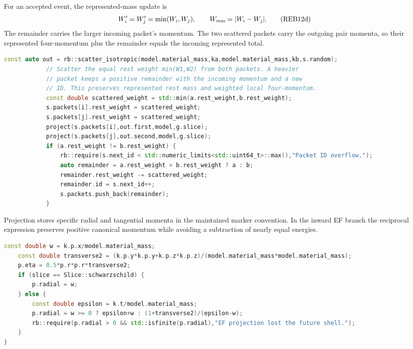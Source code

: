 For an accepted event, the represented-mass update is
\[
 W_i'=W_j'=\min(W_i,W_j),\qquad
 W_{\rm rem}=|W_i-W_j|.
 \tag{REB12d}
\]
The remainder carries the larger incoming packet's momentum. The two
scattered packets carry the outgoing pair momenta, so their represented
four-momentum plus the remainder equals the incoming represented total.
\par\medskip\noindent
\begin{minipage}{\linewidth}
\begin{lstlisting}[language=C++,showstringspaces=false]
            const auto out = rb::scatter_isotropic(model.material_mass,ka,model.material_mass,kb,s.random);
            // Scatter the equal rest weight min(W1,W2) from both packets. A heavier
            // packet keeps a positive remainder with the incoming momentum and a new
            // ID. This preserves represented rest mass and weighted local four-momentum.
            const double scattered_weight = std::min(a.rest_weight,b.rest_weight);
            s.packets[i].rest_weight = scattered_weight;
            s.packets[j].rest_weight = scattered_weight;
            project(s.packets[i],out.first,model,g.slice);
            project(s.packets[j],out.second,model,g.slice);
            if (a.rest_weight != b.rest_weight) {
                rb::require(s.next_id < std::numeric_limits<std::uint64_t>::max(),"Packet ID overflow.");
                auto remainder = a.rest_weight > b.rest_weight ? a : b;
                remainder.rest_weight -= scattered_weight;
                remainder.id = s.next_id++;
                s.packets.push_back(remainder);
            }
\end{lstlisting}
\end{minipage}

Projection stores specific radial and tangential momenta in the maintained
marker convention. In the inward EF branch the reciprocal expression
preserves positive canonical momentum while avoiding a subtraction of
nearly equal energies.
\par\medskip\noindent
\begin{minipage}{\linewidth}
\begin{lstlisting}[language=C++,showstringspaces=false]
    const double w = k.p.x/model.material_mass;
    const double transverse2 = (k.p.y*k.p.y+k.p.z*k.p.z)/(model.material_mass*model.material_mass);
    p.eta = 0.5*p.r*p.r*transverse2;
    if (slice == Slice::schwarzschild) {
        p.radial = w;
    } else {
        const double epsilon = k.t/model.material_mass;
        p.radial = w >= 0 ? epsilon+w : (1+transverse2)/(epsilon-w);
        rb::require(p.radial > 0 && std::isfinite(p.radial),"EF projection lost the future shell.");
    }
}
\end{lstlisting}
\end{minipage}



